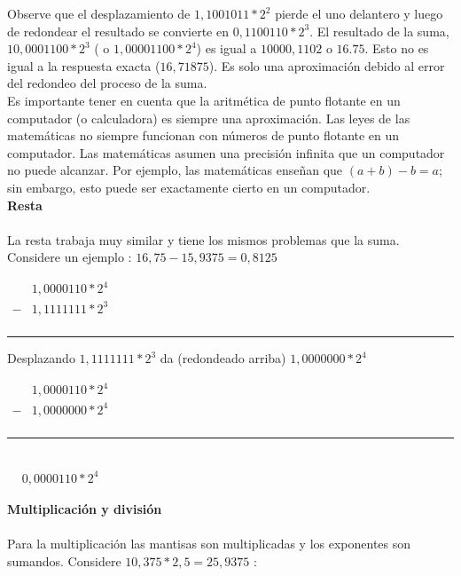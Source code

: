 \documentclass[10pt,a4paper]{article}
\begin{document}
\begin{multicols}{2}
\begin{center}
\end{center}
Observe que el desplazamiento de $1,1001011*2^{2}$ pierde el uno delantero y luego de redondear el resultado se convierte en $0,1100110*2^{3}$. El resultado de la suma, $10,0001100*2^{3}$ ( o $1,00001100*2^{4}$) es igual a $10000,1102$ o $16.75$. Esto no es igual a la respuesta exacta ($16,71875$). Es solo una aproximaci\'on debido al error del redondeo del proceso de la suma. \\
Es importante tener en cuenta que la aritm\'etica de punto flotante en un computador (o calculadora) es siempre una aproximaci\'on. Las leyes de las matem\'aticas no siempre funcionan con n\'umeros de punto
flotante en un computador. Las matem\'aticas asumen una precisi\'on infinita que un computador no puede alcanzar. Por ejemplo, las matem\'aticas ense\~nan que $(a+b)−b = a$; sin embargo, esto puede ser exactamente cierto en un computador.\\
\textbf{Resta}\\\\
La resta trabaja muy similar y tiene los mismos problemas que la suma.\\
Considere un ejemplo : $16,75 - 15,9375 = 0,8125$
\begin{center}
$\begin{matrix}
  & 1,0000110 * 2^{4} \\
- & 1,1111111 * 2^{3} \\
\end{matrix}$ \\
\rule{30mm}{0.1mm}
\end{center}
Desplazando $1,1111111*2^{3}$ da (redondeado arriba) $1,0000000*2^{4}$ \\
\begin{center}
$\begin{matrix}
  & 1,0000110 * 2^{4} \\
- & 1,0000000 * 2^{4} \\
\end{matrix}$\\
\rule{30mm}{0.1mm}\\
$\begin{matrix}
  & 0,0000110 * 2^{4}
\end{matrix}$
\end{center}
\textbf{Multiplicaci\'on y divisi\'on} \\\\
Para la multiplicaci\'on las mantisas son multiplicadas y los exponentes son sumandos. Considere $10,375 * 2,5 = 25,9375$ :\\

\end{multicols}
\end{document}
